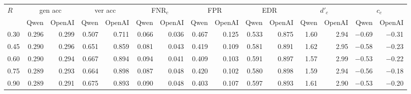 \begin{tabular}{l*{14}{r}}
\toprule
$R$ & \multicolumn{2}{c}{gen acc} & \multicolumn{2}{c}{ver acc} & \multicolumn{2}{c}{FNR$_c$} & \multicolumn{2}{c}{FPR} & \multicolumn{2}{c}{EDR} & \multicolumn{2}{c}{$d'_c$} & \multicolumn{2}{c}{$c_c$} \\
\cmidrule(lr){2-3} \cmidrule(lr){4-5} \cmidrule(lr){6-7} \cmidrule(lr){8-9} \cmidrule(lr){10-11} \cmidrule(lr){12-13} \cmidrule(lr){14-15}
 & Qwen & OpenAI & Qwen & OpenAI & Qwen & OpenAI & Qwen & OpenAI & Qwen & OpenAI & Qwen & OpenAI & Qwen & OpenAI \\
\midrule
0.30 & 0.296 & 0.299 & 0.507 & 0.711 & 0.066 & 0.036 & 0.467 & 0.125 & 0.533 & 0.875 & 1.60 & 2.94 & $-$0.69 & $-$0.31 \\
0.45 & 0.290 & 0.296 & 0.651 & 0.859 & 0.081 & 0.043 & 0.419 & 0.109 & 0.581 & 0.891 & 1.62 & 2.95 & $-$0.58 & $-$0.23 \\
0.60 & 0.290 & 0.294 & 0.667 & 0.894 & 0.094 & 0.041 & 0.409 & 0.103 & 0.591 & 0.897 & 1.57 & 2.99 & $-$0.53 & $-$0.22 \\
0.75 & 0.289 & 0.293 & 0.664 & 0.898 & 0.087 & 0.048 & 0.420 & 0.102 & 0.580 & 0.898 & 1.59 & 2.94 & $-$0.56 & $-$0.18 \\
0.90 & 0.289 & 0.291 & 0.675 & 0.893 & 0.090 & 0.048 & 0.403 & 0.107 & 0.597 & 0.893 & 1.61 & 2.90 & $-$0.53 & $-$0.20 \\
\bottomrule
\end{tabular}
